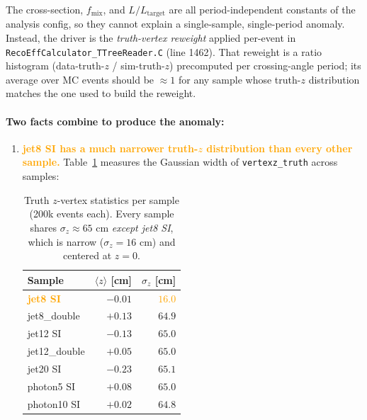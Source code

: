 \documentclass[11pt,a4paper]{article}
\newcommand{\warn}[1]{\textcolor{orange}{\textbf{#1}}}
\begin{document}
The cross-section, $f_{\mathrm{mix}}$, and $L/L_\mathrm{target}$ are all period-independent constants of the analysis config, so they cannot explain a single-sample, single-period anomaly. Instead, the driver is the \emph{truth-vertex reweight} applied per-event in \texttt{RecoEffCalculator\_TTreeReader.C} (line 1462). That reweight is a ratio histogram (data-truth-$z$ / sim-truth-$z$) precomputed per crossing-angle period; its average over MC events should be $\approx 1$ for any sample whose truth-$z$ distribution matches the one used to build the reweight.

\paragraph{Two facts combine to produce the anomaly:}

\begin{enumerate}
  \item \warn{\textbf{jet8 SI has a much narrower truth-$z$ distribution than every other sample.}} Table~\ref{tab:vtxz_widths} measures the Gaussian width of \texttt{vertexz\_truth} across samples:
  \begin{table}[H]
  \centering
  \begin{tabular}{lrr}
  \toprule
  Sample      & $\langle z \rangle$ [cm] & $\sigma_z$ [cm] \\
  \midrule
  \warn{jet8 SI}        & $-0.01$  & \warn{$16.0$} \\
  jet8\_double          & $+0.13$  & $64.9$ \\
  jet12 SI              & $-0.13$  & $65.0$ \\
  jet12\_double         & $+0.05$  & $65.0$ \\
  jet20 SI              & $-0.23$  & $65.1$ \\
  photon5 SI            & $+0.08$  & $65.0$ \\
  photon10 SI           & $+0.02$  & $64.8$ \\
  \bottomrule
  \end{tabular}
  \caption{Truth $z$-vertex statistics per sample (200k events each). Every sample shares $\sigma_z \approx 65$ cm \emph{except jet8 SI}, which is narrow ($\sigma_z = 16$ cm) and centered at $z=0$.}
  \label{tab:vtxz_widths}
  \end{table}


\end{enumerate}
\end{document}
